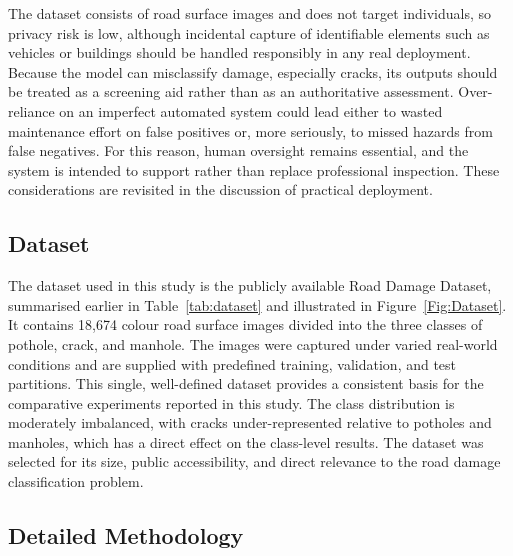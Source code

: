 \documentclass[preprint,12pt]{elsarticle}
\begin{document}
The dataset consists of road surface images and does not target individuals, so privacy risk is low, although incidental capture of identifiable elements such as vehicles or buildings should be handled responsibly in any real deployment.
Because the model can misclassify damage, especially cracks, its outputs should be treated as a screening aid rather than as an authoritative assessment.
Over-reliance on an imperfect automated system could lead either to wasted maintenance effort on false positives or, more seriously, to missed hazards from false negatives.
For this reason, human oversight remains essential, and the system is intended to support rather than replace professional inspection.
These considerations are revisited in the discussion of practical deployment.


\subsection{Dataset}

The dataset used in this study is the publicly available Road Damage Dataset, summarised earlier in Table~\ref{tab:dataset} and illustrated in Figure~\ref{Fig:Dataset}.
It contains 18{,}674 colour road surface images divided into the three classes of pothole, crack, and manhole.
The images were captured under varied real-world conditions and are supplied with predefined training, validation, and test partitions.
This single, well-defined dataset provides a consistent basis for the comparative experiments reported in this study.
The class distribution is moderately imbalanced, with cracks under-represented relative to potholes and manholes, which has a direct effect on the class-level results.
The dataset was selected for its size, public accessibility, and direct relevance to the road damage classification problem.

\subsection{Detailed Methodology}
\end{document}
